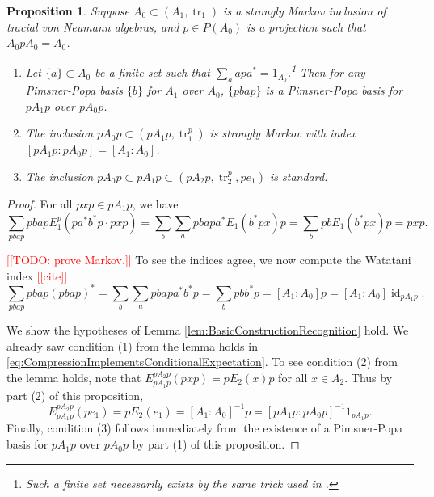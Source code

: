 \documentclass[11pt]{article}
\theoremstyle{plain}
\newtheorem{prop}[thm]{Proposition}
\theoremstyle{definition}
\DeclareMathOperator{\id}{id}
\DeclareMathOperator{\tr}{tr}
\newcommand{\nn}[1]{\textcolor{red}{[[#1]]}}
\begin{document}
\begin{prop}
\label{prop:CompressingStronglyMarkovInclusion}
Suppose $A_0 \subset (A_1, \tr_1)$ is a strongly Markov inclusion of tracial von Neumann algebras, and $p\in P(A_0)$ is a projection such that $A_0pA_0 = A_0$.
\begin{enumerate}[(1)]
\item
Let $\{a\}\subset A_0$ be a finite set such that $\sum_{a} apa^* = 1_{A_0}$.\footnote{
Such a finite set necessarily exists by the same trick used in \cite[Prop.~3(b)]{MR561983}.
}
Then for any Pimsner-Popa basis $\{b\}$ for $A_1$ over $A_0$, $\{pbap\}$ is a Pimsner-Popa basis for $pA_1p$ over $pA_0p$.
\item
The inclusion $pA_0p \subset (pA_1p, \tr_1^p)$ is strongly Markov with index $[pA_1p:pA_0p] = [A_1:A_0]$.
\item
The inclusion $pA_0p \subset pA_1p \subset (pA_2p , \tr_2^p, pe_1)$ is standard.
\end{enumerate}
\end{prop}
\begin{proof}
\mbox{}
\item[\underline{Proof of (1):}]
For all $pxp \in pA_1p$, we have
$$
\sum_{pbap} 
pbap
E^p_1(pa^*b^*p \cdot pxp)
=
\sum_b
\sum_a
pbapa^* E_1(b^*px)p
=
\sum_b pbE_1(b^*px)p
=
pxp.
$$

\item[\underline{Proof of (2):}]
\nn{TODO: prove Markov.}
To see the indices agree, we now compute the Watatani index \nn{cite}
$$
\sum_{pbap} pbap(pbap)^*
=
\sum_b\sum_a pbapa^*b^*p
=
\sum_b pbb^*p
=
[A_1:A_0] p
=
[A_1:A_0] \id_{pA_1p}.
$$

\item[\underline{Proof of (3):}]
We show the hypotheses of Lemma \ref{lem:BasicConstructionRecognition} hold.
We already saw condition (1) from the lemma holds in \eqref{eq:CompressionImplementsConditionalExpectation}.
To see condition (2) from the lemma holds, note that $E^{pA_2p}_{pA_1p}(pxp) = pE_2(x)p$ for all $x\in A_2$.
Thus by part (2) of this proposition,
$$
E^{pA_2p}_{pA_1p}(pe_1) 
= 
pE_2(e_1) 
= 
[A_1:A_0]^{-1}p 
= 
[pA_1p:pA_0p]^{-1} 1_{pA_1p}.
$$
Finally, condition (3) follows immediately from the existence of a Pimsner-Popa basis for $pA_1p$ over $pA_0p$ by part (1) of this proposition.
\end{proof}
\end{document}
